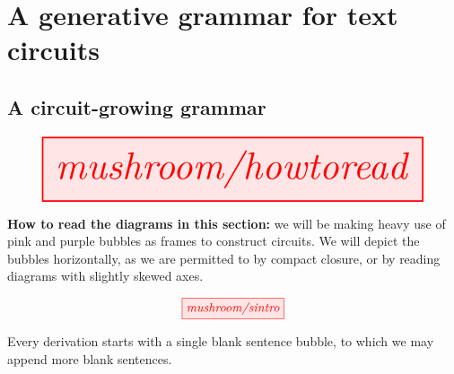 \newpage

\section{A generative grammar for text circuits}

\subsection{A circuit-growing grammar}



\begin{marginfigure}
\centering
\[
\resizebox{\textwidth}{!}{\tikzfig{mushroom/howtoread}}
\]
\caption{\textbf{How to read the diagrams in this section:} we will be making heavy use of pink and purple bubbles as frames to construct circuits. We will depict the bubbles horizontally, as we are permitted to by compact closure, or by reading diagrams with slightly skewed axes.}
\end{marginfigure}

\begin{marginfigure}
\centering
\[
\tikzfig{mushroom/sintro}
\]
\caption{Every derivation starts with a single blank sentence bubble, to which we may append more blank sentences.}
\end{marginfigure}

